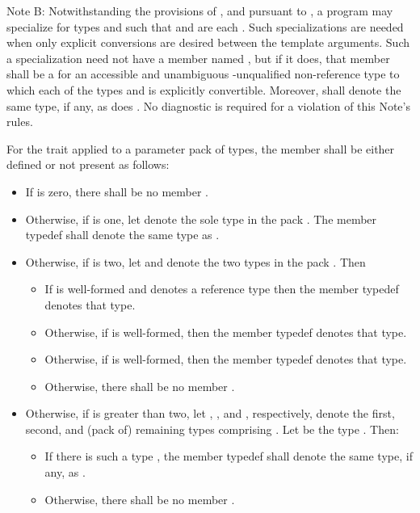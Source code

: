 \pnum
Note B: Notwithstanding the provisions of , and
pursuant to ,
a program may specialize 
for types  and  such that
 and
 are each .
\enternote Such specializations are needed when only explicit conversions
are desired between the template arguments. \exitnote
Such a specialization need not have a member named ,
but if it does, that member shall be a 
for an accessible and unambiguous \cv-unqualified non-reference type 
to which each of the types  and  is explicitly convertible.
Moreover,  shall denote
the same type, if any, as does .
No diagnostic is required for a violation of this Note's rules.

\pnum
For the  trait applied to a parameter pack  of
types, the member  shall be either defined or not present as follows:
\begin{itemize}
\item If  is zero, there shall be no member .
\item Otherwise, if  is one, let  denote the sole
  type in the pack . The member typedef  shall denote the
  same type as .
\item Otherwise, if  is two, let  and 
  denote the two types in the pack . Then
\begin{itemize}
\item If  is well-formed and denotes a reference type
  then the member typedef  denotes that type.
\item Otherwise, if  is well-formed, then the member typedef
   denotes that type.
\item Otherwise, if  is well-formed, then the
  member typedef  denotes that type.
\item Otherwise, there shall be no member .
\end{itemize}
\item Otherwise, if  is greater than two, let ,
  , and , respectively, denote the first, second, and
  (pack of) remaining types comprising . Let  be the type
  . Then:
\begin{itemize}
\item If there is such a type , the member typedef  shall
  denote the same type, if any, as .
\item Otherwise, there shall be no member .
\end{itemize}
\end{itemize}

